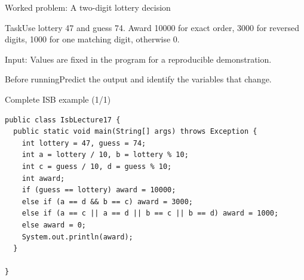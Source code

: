 \documentclass[10pt,aspectratio=169]{beamer}
\begin{document}
\begin{frame}[fragile,t]{Worked problem: A two{-}digit lottery decision}
\begin{block}{Task}Use lottery 47 and guess 74. Award 10000 for exact order, 3000 for reversed digits, 1000 for one matching digit, otherwise 0.\end{block}
\small Input: Values are fixed in the program for a reproducible demonstration.\par\vspace{3mm}\begin{exampleblock}{Before running}Predict the output and identify the variables that change.\end{exampleblock}
\end{frame}

\begin{frame}[fragile,t]{Complete ISB example (1/1)}
\begin{lstlisting}
public class IsbLecture17 {
  public static void main(String[] args) throws Exception {
    int lottery = 47, guess = 74;
    int a = lottery / 10, b = lottery % 10;
    int c = guess / 10, d = guess % 10;
    int award;
    if (guess == lottery) award = 10000;
    else if (a == d && b == c) award = 3000;
    else if (a == c || a == d || b == c || b == d) award = 1000;
    else award = 0;
    System.out.println(award);
  }

}
\end{lstlisting}
\end{frame}
\end{document}
